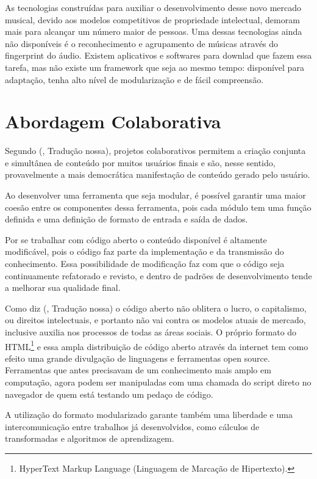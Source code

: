 As tecnologias construídas para auxiliar o desenvolvimento desse novo mercado musical, devido aos modelos competitivos de propriedade intelectual, demoram mais para alcançar um número maior de pessoas. Uma dessas tecnologias ainda não disponíveis é o reconhecimento e agrupamento de músicas através do fingerprint do áudio. Existem aplicativos e softwares para downlad que fazem essa tarefa, mas não existe um framework que seja ao mesmo tempo: disponível para adaptação, tenha alto nível de modularização e de fácil compreensão.


\section{Abordagem Colaborativa}
\label{s.abordagem}

Segundo  (\citeyear{unite10}, Tradução nossa), projetos colaborativos permitem a criação conjunta e simultânea de conteúdo por muitos usuários finais e são, nesse sentido, provavelmente a mais democrática manifestação de conteúdo gerado pelo usuário.

Ao desenvolver uma ferramenta que seja modular, é possível garantir uma maior coesão entre os componentes dessa ferramenta, pois cada módulo tem uma função definida e uma definição de formato de entrada e saída de dados.

Por se trabalhar com código aberto o conteúdo disponível é altamente modificável, pois o código faz parte da implementação e da transmissão do conhecimento.
Essa possibilidade de modificação faz com que o código seja continuamente refatorado e revisto, e dentro de padrões de desenvolvimento tende a melhorar sua qualidade final.

Como diz  (\citeyear{weber}, Tradução nossa) o código aberto não oblitera o lucro, o capitalismo, ou direitos intelectuais, e portanto não vai contra os modelos atuais de mercado, inclusive auxilia nos processos de todas as áreas sociais. O próprio formato do HTML\footnote{HyperText Markup Language (Linguagem de Marcação de Hipertexto).} e essa ampla distribuição de código aberto através da internet tem como efeito uma grande divulgação de linguagens e ferramentas open source. Ferramentas que antes precisavam de um conhecimento mais amplo em computação, agora podem ser manipuladas com uma chamada do script direto no navegador de quem está testando um pedaço de código.

A utilização do formato modularizado garante também uma liberdade e uma intercomunicação entre trabalhos já desenvolvidos, como cálculos de transformadas e algoritmos de aprendizagem.%

